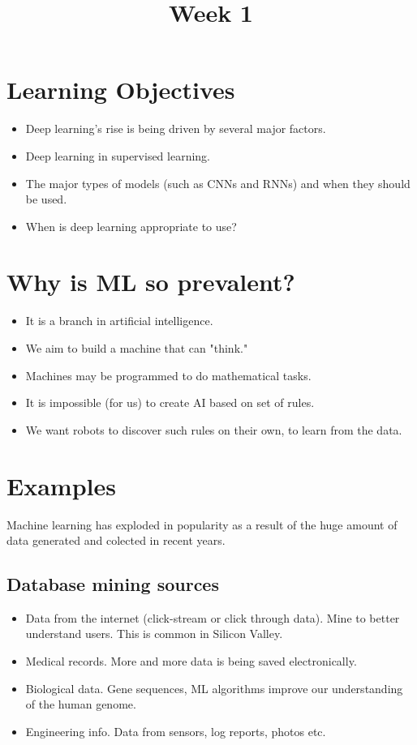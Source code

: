 \documentclass{article}
\title{Week 1}
\begin{document}
\maketitle
\newpage
{}

\section*{Learning Objectives}
\begin{itemize}
  \item Deep learning's rise is being driven by several major factors.
  \item Deep learning in supervised learning.
  \item The major types of models (such as CNNs and RNNs) and when they should be used.
  \item When is deep learning appropriate to use?
\end{itemize}

\section*{Why is ML so prevalent?}
\begin{itemize}
  \item It is a branch in artificial intelligence.
  \item We aim to build a machine that can "think."
  \item Machines may be programmed to do mathematical tasks.
  \item It is impossible (for us) to create AI based on set of rules.
  \item We want robots to discover such rules on their own, to learn from the data.
\end{itemize}

\section*{Examples}

Machine learning has exploded in popularity as a result of the huge amount of data generated and colected in recent years.

\subsection*{Database mining sources}
\begin{itemize}
  \item Data from the internet (click-stream or click through data). Mine to better understand users. This is common in Silicon Valley.
  \item Medical records. More and more data is being saved electronically.
  \item Biological data. Gene sequences, ML algorithms improve our understanding of the human genome.
  \item Engineering info. Data from sensors, log reports, photos etc.
\end{itemize}
\end{document}

